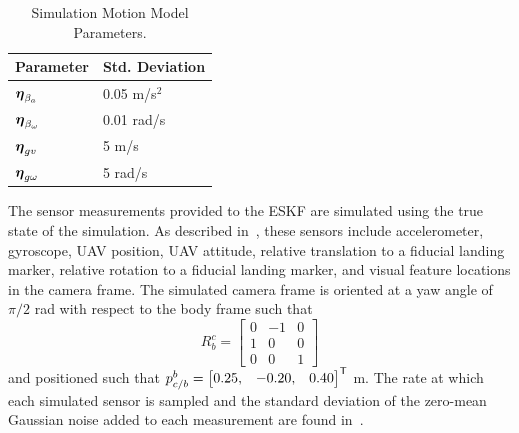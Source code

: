 \begin{table}[htb!]
  \begin{center}
    \caption{Simulation Motion Model Parameters.}
    \label{tab:sim_process_noises}
    \begin{tabular}{l|l}
      \textbf{Parameter} & \textbf{Std. Deviation} \\
      \hline
      $\boldsymbol{\mathrm{\eta}}_{\beta_a}$ & 0.05 m/s$^2$ \\
      $\boldsymbol{\mathrm{\eta}}_{\beta_\omega}$ & 0.01 rad/s \\
      $\boldsymbol{\mathrm{\eta}}_{gv}$ & 5 m/s \\
      $\boldsymbol{\mathrm{\eta}}_{g\omega}$ & 5 rad/s \\
    \end{tabular}
  \end{center}
\end{table}

The sensor measurements provided to the ESKF are simulated using the true
state of the simulation. As described 
in~, these sensors include accelerometer,
gyroscope, UAV position, UAV attitude,
relative translation to a fiducial landing marker, relative rotation to a
fiducial landing  marker, and
visual feature locations in the camera frame.
The 
simulated camera frame is oriented at a yaw angle of $\pi/2$ rad with respect to the body
frame such that
\begin{equation}
  R_b^c =
  \begin{bmatrix}
    0 & -1 & 0 \\
    1 & 0 & 0 \\
    0 & 0 & 1
  \end{bmatrix}
\end{equation}
and positioned such that $p_{c/b}^b = \begin{bmatrix}0.25, & -0.20, &
0.40 \end{bmatrix}^{\mathsf{T}}$ m.
The rate at which each simulated sensor is sampled and the standard deviation of
the zero-mean Gaussian noise added to each measurement are found
in~.

